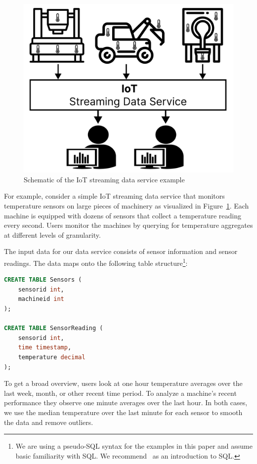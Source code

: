 \documentclass[	DIV=calc,%
							paper=letter,%
							fontsize=11pt,%
							twocolumn]{scrartcl}	 					%
\begin{document}
\begin{figure}[h]
\includegraphics[width=\linewidth]{iot_example_schematic.pdf}
\caption{Schematic of the IoT streaming data service example}
\label{fig:iot_example}
\end{figure}

For example, consider a simple IoT streaming data service that monitors temperature sensors on large pieces of machinery as visualized in Figure~\ref{fig:iot_example}. Each machine is equipped with dozens of sensors that collect a temperature reading every second. Users monitor the machines by querying for temperature aggregates at different levels of granularity.

The input data for our data service consists of sensor information and sensor readings. The data maps onto the following table structure\footnote{We are using a pseudo-SQL syntax for the examples in this paper and assume basic familiarity with SQL. We recommend~\cite{} as an introduction to SQL.}:
\begin{lstlisting}[language=SQL]
CREATE TABLE Sensors (
    sensorid int,
    machineid int
);

CREATE TABLE SensorReading (
    sensorid int,
    time timestamp,
    temperature decimal
);
\end{lstlisting}

To get a broad overview, users look at one hour temperature averages over the last week, month, or other recent time period. To analyze a machine's recent performance they observe one minute averages over the last hour. In both cases, we use the median temperature over the last minute for each sensor to smooth the data and remove outliers.
\end{document}
